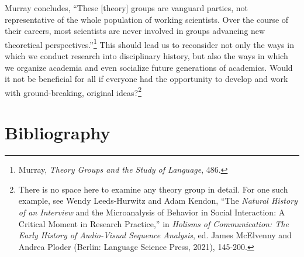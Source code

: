 \documentclass{tufte-handout}
\begin{document}
Murray concludes, ``These {[}theory{]} groups are vanguard parties, not
representative of the whole population of working scientists. Over the
course of their careers, most scientists are never involved in groups
advancing new theoretical
perspectives.''\footnote{Murray, \emph{Theory Groups and the Study of Language}, 486.
} This should lead
us to reconsider not only the ways in which we conduct research into
disciplinary history, but also the ways in which we organize academia
and even socialize future generations of academics. Would it not be
beneficial for all if everyone had the opportunity to develop and work
with ground-breaking, original
ideas?\footnote{ There is no space here to examine any theory group in detail. For one
  such example, see Wendy Leeds-Hurwitz and Adam Kendon, ``The
  \emph{Natural History of an Interview} and the Microanalysis of
  Behavior in Social Interaction: A Critical Moment in Research
  Practice,'' in \emph{Holisms of Communication: The Early History of
  Audio-Visual Sequence Analysis}, ed. James McElvenny and Andrea Ploder
  (Berlin: Language Science Press, 2021), 145-200.}





\section{Bibliography}\label{bibliography}
\end{document}
